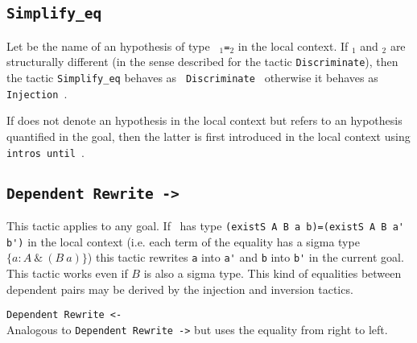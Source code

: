 \subsection{\tt Simplify\_eq {\ident}}
\label{Simplify-eq}
Let {\ident} be the name of an hypothesis of type {\tt
  {\term$_1$}={\term$_2$}} in the local context. If {\term$_1$} and
{\term$_2$} are structurally different (in the sense described for the
tactic {\tt Discriminate}), then the tactic {\tt Simplify\_eq} behaves as {\tt
  Discriminate {\ident}} otherwise it behaves as {\tt Injection
  {\ident}}.

\Rem If {\ident} does not denote an hypothesis in the local context
but refers to an hypothesis quantified in the goal, then the
latter is first introduced in the local context using
\texttt{intros until \ident}.


\subsection{\tt Dependent Rewrite -> {\ident}}
\label{Dependent-Rewrite}
This tactic applies to any goal.  If \ident\ has type 
\verb+(existS A B a b)=(existS A B a' b')+ 
in the local context (i.e. each term of the
equality has a sigma type $\{ a:A~ \&~(B~a)\}$) this tactic rewrites
\verb+a+ into \verb+a'+ and \verb+b+ into \verb+b'+ in the current
goal. This tactic works even if $B$ is also a sigma type.  This kind
of equalities between dependent pairs may be derived by the injection
and inversion tactics.

\begin{Variants}
\item{\tt Dependent Rewrite <- {\ident}}
 \\
Analogous to {\tt Dependent Rewrite ->} but uses the equality from
right to left.
\end{Variants}

